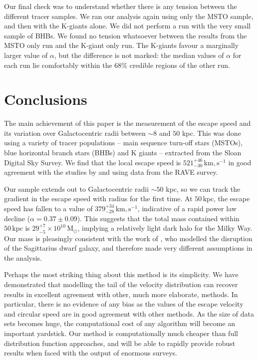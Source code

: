 \documentclass[useAMS,twocolumn,usenatbib]{mn2e}
\def\kpc{{\,\mathrm{kpc}}}
\def\km,s{{\,\mathrm{km,s^{-1}}}}
\def\Msun{{\,\mathrm{M}_\odot}}
\begin{document}
Our final check was to understand whether there is any tension between the different tracer samples. 
We ran our analysis again using only the MSTO sample, and then with the K-giants alone. 
We did not perform a run with the very small sample of BHBs. 
We found no tension whatsoever between the results from the MSTO only run and the K-giant only run. 
The K-giants favour a marginally larger value of $\alpha$, but the difference is not marked: the median values of $\alpha$ for each run lie comfortably within the 68\% credible regions of the other run.

\section{Conclusions}

The main achievement of this paper is the measurement of the escape speed and its variation over Galactocentric radii between $\sim 8$ and $50$ kpc.  
This was done using a variety of tracer populations -- main sequence turn-off stars (MSTOs), blue horizontal branch stars (BHBs) and K giants -- extracted from the Sloan Digital Sky Survey. 
We find that the local escape speed is $521^{+46}_{-30}\km,s$ in good agreement with the studies by \cite{Sm07} and \cite{Pi14} using data from the RAVE survey.

Our sample extends out to Galactocentric radii $\sim 50$ kpc, so we can track the gradient in the escape speed with radius for the first time. 
At $50\kpc$, the escape speed has fallen to a value of $379^{+34}_{-28}\km,s$, indicative of a rapid power law decline ($\alpha = 0.37\pm0.09$).
This suggests that the total mass contained within $50\kpc$ is $29^{+7}_{-5}\times10^{10}\Msun$, implying a relatively light dark halo for the Milky Way. 
Our mass is pleasingly consistent with the work of \citet{Gi14}, who modelled the disruption of the Sagittarius dwarf galaxy, and therefore made very different assumptions in the analysis.

Perhaps the most striking thing about this method is its simplicity. 
We have demonstrated that modelling the tail of the velocity distribution can recover results in excellent agreement with other, much more elaborate, methods. 
In particular, there is no evidence of any bias as the values of the escape velocity and circular speed are in good agreement with other methods.  
As the size of data sets becomes huge, the computational cost of any algorithm will become an important yardstick. 
Our method is computationally much cheaper than full distribution function approaches, and will be able to rapidly provide robust results when faced with the output of enormous surveys.
\end{document}

